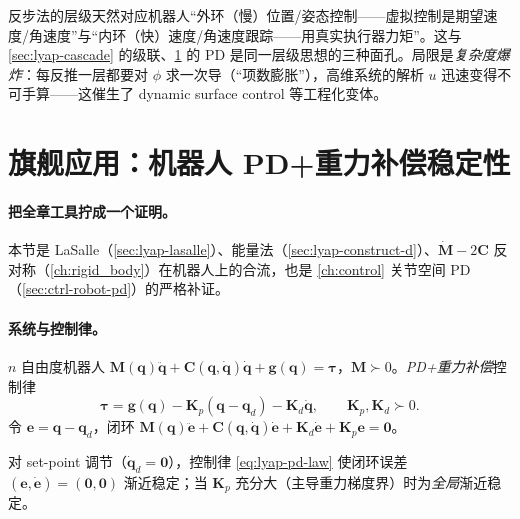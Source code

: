 \begin{insight}
反步法的层级天然对应机器人“外环（慢）位置/姿态控制——虚拟控制是期望速度/角速度”与“内环（快）速度/角速度跟踪——用真实执行器力矩”。这与 \cref{sec:lyap-cascade} 的级联、\cref{sec:lyap-robot-pd} 的 PD 是同一层级思想的三种面孔。局限是\emph{复杂度爆炸}：每反推一层都要对 $\phi$ 求一次导（“项数膨胀”），高维系统的解析 $u$ 迅速变得不可手算——这催生了 dynamic surface control 等工程化变体。
\end{insight}

\section{旗舰应用：机器人 PD+重力补偿稳定性}
\label{sec:lyap-robot-pd}

\paragraph{把全章工具拧成一个证明。}
本节是 LaSalle（\cref{sec:lyap-lasalle}）、能量法（\cref{sec:lyap-construct-d}）、$\dot{\mathbf{M}}-2\mathbf{C}$ 反对称（\cref{ch:rigid_body}）在机器人上的合流，也是 \cref{ch:control} 关节空间 PD（\cref{sec:ctrl-robot-pd}）的严格补证。

\paragraph{系统与控制律。}
$n$ 自由度机器人 $\mathbf{M}(\mathbf{q})\ddot{\mathbf{q}}+\mathbf{C}(\mathbf{q},\dot{\mathbf{q}})\dot{\mathbf{q}}+\mathbf{g}(\mathbf{q})=\boldsymbol{\tau}$，$\mathbf{M}\succ0$。\emph{PD+重力补偿}控制律
\begin{equation}
  \boldsymbol{\tau}=\mathbf{g}(\mathbf{q})-\mathbf{K}_p(\mathbf{q}-\mathbf{q}_d)-\mathbf{K}_d\dot{\mathbf{q}},\qquad\mathbf{K}_p,\mathbf{K}_d\succ0.
  \label{eq:lyap-pd-law}
\end{equation}
令 $\mathbf{e}=\mathbf{q}-\mathbf{q}_d$，闭环 $\mathbf{M}(\mathbf{q})\ddot{\mathbf{e}}+\mathbf{C}(\mathbf{q},\dot{\mathbf{q}})\dot{\mathbf{e}}+\mathbf{K}_d\dot{\mathbf{e}}+\mathbf{K}_p\mathbf{e}=\mathbf{0}$。

\begin{theorem}
\label{thm:lyap-robot-pd}
对 set-point 调节（$\dot{\mathbf{q}}_d=\mathbf{0}$），控制律 \cref{eq:lyap-pd-law} 使闭环误差 $(\mathbf{e},\dot{\mathbf{e}})=(\mathbf{0},\mathbf{0})$ 渐近稳定；当 $\mathbf{K}_p$ 充分大（主导重力梯度界）时为\emph{全局}渐近稳定\cite{takegaki1981feedback}。
\end{theorem}

